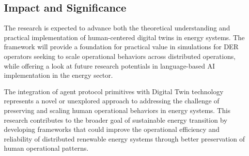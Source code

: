 \documentclass[12pt,a4paper]{article}
\begin{document}
\subsection{Impact and Significance}

The research is expected to advance both the theoretical understanding and practical implementation of human-centered digital twins in energy systems. The framework will provide a foundation for practical value in simulations for DER operators seeking to scale operational behaviors across distributed operations, while offering a look at future research potentials in language-based AI implementation in the energy sector.

The integration of agent protocol primitives with Digital Twin technology represents a novel or unexplored approach to addressing the challenge of preserving and scaling human operational behaviors in energy systems. This research contributes to the broader goal of sustainable energy transition by developing frameworks that could improve the operational efficiency and reliability of distributed renewable energy systems through better preservation of human operational patterns.

\clearpage

\printbibliography
\end{document}
